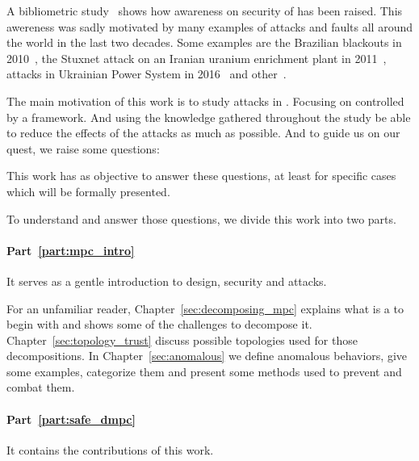 \documentclass[../main.tex]{subfiles}
\begin{document}
A bibliometric study~\cite{ZacchiaEtAl2019} shows how awareness on security of \cps{} has been raised.
This awereness was sadly motivated by many examples of attacks and faults all around the world in the last two decades.
Some examples are the Brazilian blackouts in 2010~\cite{Conti2010}, the Stuxnet attack on an Iranian uranium enrichment plant in 2011~\cite{Langner2011}, attacks in Ukrainian Power System in 2016~\cite{Bindra2017} and other~\cite{DingEtAl2018,DibajiEtAl2019}.

The main motivation of this work is to study attacks in \cps{}.
Focusing on \cps{} controlled by a \dmpc{} framework.
And using the knowledge gathered throughout the study be able to reduce the effects of the attacks as much as possible.
And to guide us on our quest, we raise some questions:

This work has as objective to answer these questions, at least for specific cases which will be formally presented.

To understand and answer those questions, we divide this work into two parts.

\paragraph{Part~\ref{part:mpc_intro}} It serves as a gentle introduction to \dmpc{} design, security and attacks.

For an unfamiliar reader, Chapter~\ref{sec:decomposing_mpc} explains what is a \mpc{} to begin with and shows some of the challenges to decompose it.
Chapter~\ref{sec:topology_trust} discuss possible topologies used for those decompositions.
In Chapter~\ref{sec:anomalous} we define anomalous behaviors, give some examples, categorize them and present some methods used to prevent and combat them.

\paragraph{Part~\ref{part:safe_dmpc}} It contains the contributions of this work.
\end{document}
